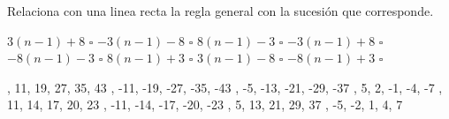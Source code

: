 \question[10] Relaciona con una linea recta la regla general con la sucesión que corresponde.

\begin{multicols}{2}
    \begin{flushright}
        \begin{choices}
            \choice $3(n - 1) + 8 $ $\square$
            \choice $-3(n - 1) - 8$ $\square$
            \choice $8(n - 1) - 3 $ $\square$
            \choice $-3(n - 1) + 8$ $\square$
            \choice $-8(n - 1) - 3$ $\square$
            \choice $8(n - 1) + 3 $ $\square$
            \choice $3(n - 1) - 8 $ $\square$
            \choice $-8(n - 1) + 3$ $\square$
        \end{choices}
    \end{flushright}

    \vspace{1cm}
    \begin{checkboxes}
        , 11, 19, 27, 35, 43       \vspace{0.2cm}
        , -11, -19, -27, -35, -43 \vspace{0.2cm}
        , -5, -13, -21, -29, -37   \vspace{0.2cm}
        , 5, 2, -1, -4, -7         \vspace{0.2cm}
        , 11, 14, 17, 20, 23       \vspace{0.2cm}
        , -11, -14, -17, -20, -23 \vspace{0.2cm}
        , 5, 13, 21, 29, 37       \vspace{0.2cm}
        , -5, -2, 1, 4, 7         \vspace{0.2cm}
    \end{checkboxes}
\end{multicols}


